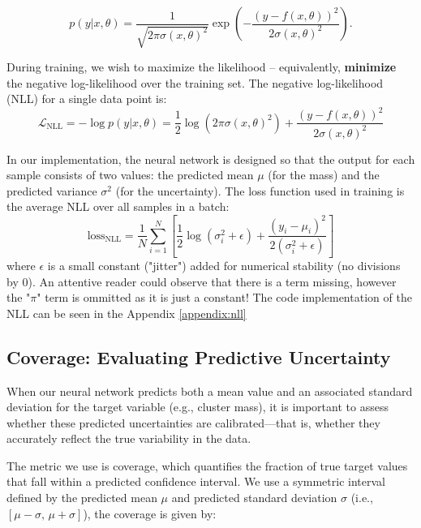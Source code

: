 \begin{equation}
    p(y|x, \theta) = \frac{1}{\sqrt{2\pi \sigma(x, \theta)^2}} \exp\left( -\frac{(y - f(x, \theta))^2}{2\sigma(x, \theta)^2} \right).
\end{equation}

During training, we wish to maximize the likelihood --
equivalently, \textbf{minimize} the negative log-likelihood
over the training set. The negative log-likelihood (NLL) 
for a single data point is:
\begin{equation}
    \mathcal{L}_{\mathrm{NLL}} = -\log p(y|x, \theta) = \frac{1}{2} \log \left(2\pi \sigma(x, \theta)^2\right) + \frac{(y - f(x, \theta))^2}{2\sigma(x, \theta)^2}
\end{equation}

In our implementation, the neural network is designed so 
that the output for each sample consists of two values: 
the predicted mean $\mu$ (for the mass) and the predicted 
variance $\sigma^2$ (for the uncertainty). The loss function 
used in training is the average NLL over all samples in a batch:
\begin{equation}
    \mathrm{loss}_{\mathrm{NLL}} = \frac{1}{N} \sum_{i=1}^N \left[ \frac{1}{2} \log \left(\sigma_i^2 + \epsilon\right) + \frac{(y_i - \mu_i)^2}{2 (\sigma_i^2 + \epsilon)} \right]
\end{equation}
where $\epsilon$ is a small constant ("jitter") added for numerical 
stability (no divisions by 0). An attentive reader could observe that there is 
a term missing, however the "$\pi$" term is ommitted as it is just a constant!
The code implementation of the NLL can be seen in the Appendix \ref{appendix:nll}

\subsection{Coverage: Evaluating Predictive Uncertainty}
\label{sec:coverage}

When our neural network predicts both a mean value and an associated 
standard deviation for the target variable (e.g., cluster mass), 
it is important to assess whether these predicted uncertainties 
are calibrated---that is, whether they accurately reflect the true 
variability in the data.

The metric we use is coverage,
which quantifies the fraction of true target values that 
fall within a predicted confidence interval. We use a 
symmetric interval defined by the predicted mean $\mu$ and 
predicted standard deviation 
$\sigma$ (i.e., $[\mu - \sigma,\, \mu + \sigma]$), the  coverage 
is given by:

